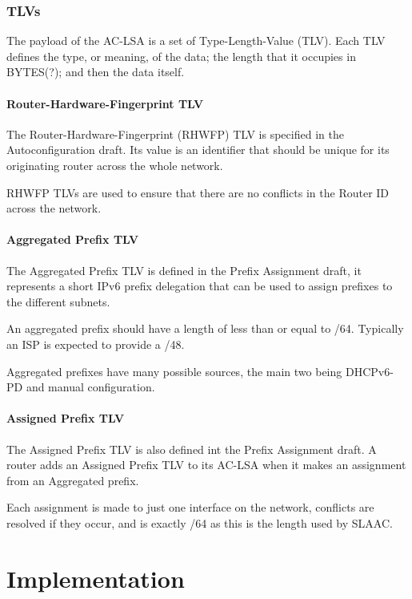 \documentclass[12pt]{report}
\begin{document}
\subsection{TLVs}
The payload of the AC-LSA is a set of Type-Length-Value (TLV). Each TLV
defines the type, or meaning, of the data; the length that it occupies in
BYTES(?); and then the data itself. 

\subsubsection{Router-Hardware-Fingerprint TLV}
The Router-Hardware-Fingerprint (RHWFP) TLV is specified in the
Autoconfiguration draft. Its value is an identifier that should be unique for
its originating router across the whole network. 

RHWFP TLVs are used to ensure that there are no conflicts in the Router ID
across the network.

\subsubsection{Aggregated Prefix TLV}
The Aggregated Prefix TLV is defined in the Prefix Assignment draft, it
represents a short IPv6 prefix delegation that can be used to assign prefixes
to the different subnets. 

An aggregated prefix should have a length of less than or equal to /64.
Typically an ISP is expected to provide a /48.

Aggregated prefixes have many possible sources, the main two being DHCPv6-PD and
manual configuration. 

\subsubsection{Assigned Prefix TLV}
The Assigned Prefix TLV is also defined int the Prefix Assignment draft. A
router adds an Assigned Prefix TLV to its AC-LSA when it makes an assignment
from an Aggregated prefix.  

Each assignment is made to just one interface on the network, conflicts are
resolved if they occur, and is exactly /64 as this is the length used by SLAAC.

\chapter{Implementation}
\end{document}

